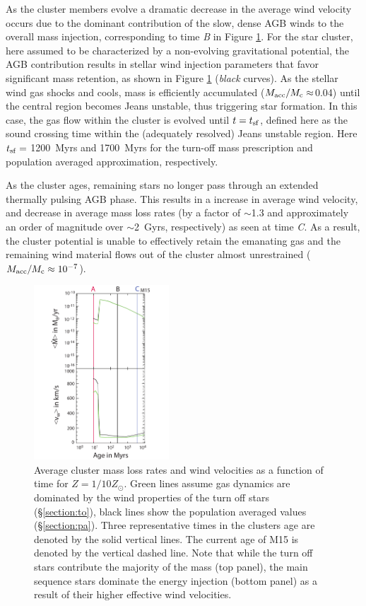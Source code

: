 \documentclass[fleqn,usenatbib]{mnras}
\begin{document}
As the cluster members evolve
a dramatic decrease in the average wind velocity occurs due  to the dominant contribution  of the slow, dense AGB winds to the overall mass injection, corresponding to time {\it B} in   Figure \ref{fig:fig1}. For the star cluster, here assumed to be characterized by a non-evolving gravitational potential,  the AGB contribution  results in stellar wind injection parameters that favor significant  mass retention, as shown in Figure \ref{fig:fig1} ({\it black} curves).  As the stellar wind gas shocks and   cools, mass is efficiently accumulated ($M_{\rm acc}/M_{\rm c} \approx$0.04) until the central region becomes Jeans unstable, thus triggering star formation. In this case, the  gas flow within the cluster is  evolved until $t = t_{\rm sf}$, defined here as the sound crossing time within the  (adequately  resolved) Jeans unstable region. Here $t_{\rm sf} = $ 1200~Myrs and 1700~Myrs  for the turn-off mass  prescription and population averaged approximation, respectively.

As the cluster ages, remaining stars no longer pass through an extended thermally pulsing AGB phase.   This results in a increase in 
average wind velocity, and decrease in average mass loss rates (by a factor of $\sim$1.3 and approximately an order of magnitude over $\sim$2~Gyrs, respectively)  as seen at time {\it C}.
As a result, the cluster potential  is unable to effectively retain the emanating gas and the remaining wind material flows out of the cluster almost unrestrained ($M_{\rm acc}/M_{\rm c} \approx10^{-7}$).  


\begin{figure}
\centering\includegraphics[width=0.45\textwidth]{fig1_updated4.pdf}
\caption{Average cluster mass loss rates and wind velocities as a function 
of time for $Z = 1/10 Z_\odot$.
Green lines assume gas  dynamics are dominated by the wind properties of the turn off stars (\S \ref{section:to}), black lines 
show  the population averaged values (\S \ref{section:pa}).  Three representative times in the clusters age are denoted by the solid vertical lines.  
The current age of M15 is denoted by the vertical dashed line.  Note that while the turn off stars contribute the majority of the mass (top panel), the main sequence stars dominate the energy injection (bottom panel) as a result of their  higher effective wind velocities.}
\label{fig:fig1}
\end{figure} 
\end{document}
